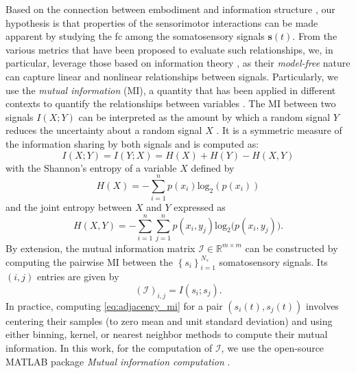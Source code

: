 Based on the connection between embodiment and information structure \cite{Pfeifer2007Selforganizationembodiment}, our hypothesis is that properties of the sensorimotor interactions can be made apparent by studying the \ac{fc} among the somatosensory signals $ \bm{s}(t) $. From the various metrics that have been proposed to evaluate such relationships, we, in particular, leverage those based on information theory \cite{Bonsignorio2020EntropyBasedMetrics,Bonsignorio2013Quantifyingevolutionaryself}, as their \emph{model-free} nature can capture linear and nonlinear relationships between signals. Particularly, we use the \emph{mutual information} (MI), a quantity that has been applied in different contexts to quantify the relationships between variables \cite{Steuer2002mutualinformationdetecting}. The MI between two signals $ I\left(X;Y\right) $ can be interpreted as the amount by which a random signal $ Y $ reduces the uncertainty about a random signal $ X $ \cite{Cover1999Elementsinformationtheory}. It is a symmetric measure of the information sharing by both signals and is computed as:
\begin{equation}\label{eq:mutual_information}
	I\left(X;Y\right) =I\left(Y;X\right) = H(X) + H(Y) - H(X,Y)
\end{equation}
with the Shannon's entropy of a variable $X$ defined by 
\begin{equation}\label{eq:entropy}
	H(X) = -\sum_{i=1}^{n}p(x_i)\text{log}_2\left(p\left(x_i\right)\right)
\end{equation}
and the joint entropy between $ X $ and $ Y $ expressed as
\begin{equation}\label{eq:joint_entropy}
	H(X,Y) = -\sum_{i=1}^{n}\sum_{j=1}^{n} p(x_i,y_j)\text{log}_2\big(p\left(x_i,y_j\right)\big).
\end{equation}
By extension, the mutual information matrix $\bm{\mathcal{I}} \in \mathbb{R}^{m \times m}$ can be constructed by computing the pairwise MI between the $\left\lbrace s_i\right\rbrace^{N_s}_{i=1}$ somatosensory signals. Its $(i,j)$ entries are given by
\begin{equation}\label{eq:adjacency_mi}
	(\bm{\mathcal{I}})_{i,j} = I(s_i;s_j).
\end{equation}
In practice, computing \eqref{eq:adjacency_mi}  for a pair $\left({s}_i(t),{s}_j(t)\right)$ involves centering their samples (to zero mean and unit standard deviation) and using either binning, kernel, or nearest neighbor methods \cite{WaltersWilliams2009Estimationmutualinformation} to compute their mutual information. In this work, for the computation of $\bm{\mathcal{I}}$, we use the open-source MATLAB package \emph{Mutual information computation} \cite{PengMutualInformationcomputation}.

